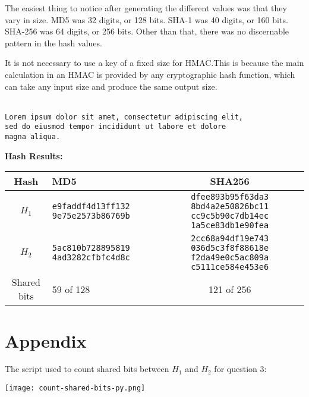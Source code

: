 \documentclass[12pt,largemargins]{homework}
\newcommand{\code}{\texttt}
\begin{document}
\maketitle

The easiest thing to notice after generating the different values was that
they vary in size. MD5 was 32 digits, or 128 bits. SHA-1 was 40 digits, or
160 bits. SHA-256 was 64 digits, or 256 bits. Other than that, there was no
discernable pattern in the hash values.

It is not necessary to use a key of a fixed size for HMAC.\@ This is because the
main calculation in an HMAC is provided by any cryptographic hash function,
which can take any input size and produce the same output size.

\begin{alphaparts}
    \\\code{Lorem ipsum dolor sit amet, consectetur adipiscing elit,
    \\sed do eiusmod tempor incididunt ut labore et dolore
    \\magna aliqua.}

    \textbf{Hash Results:}
    \begin{center}
    \begin{tabular}{|c|M|S|}\hline
        \textbf{Hash} & \textbf{MD5} & \textbf{SHA256} \\\hline
        $H_1$ & \code{e9faddf4d13ff132 9e75e2573b86769b} & \code{dfee893b95f63da3
        8bd4a2e50826bc11 cc9c5b90c7db14ec 1a5ce83db1e90fea}\\\hline
        $H_2$ & \code{5ac810b728895819 4ad3282cfbfc4d8c} & \code{2cc68a94df19e743
        036d5c3f8f88618e f2da49e0c5ac809a c5111ce584e453e6}\\\hline
        Shared bits & 59 of 128 & 121 of 256 \\\hline
    \end{tabular}
    \end{center}
\end{alphaparts}

\begin{alphaparts}
\end{alphaparts}

\section*{Appendix}
The script used to count shared bits between $H_1$ and $H_2$ for question 3:
\begin{center}
    \texttt{[image: count-shared-bits-py.png]}
\end{center}
\end{document}
